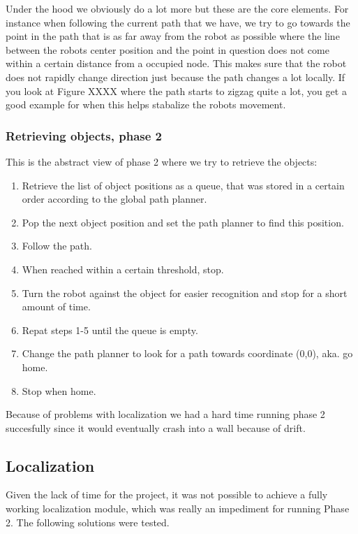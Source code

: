 Under the hood we obviously do a lot more but these are the core elements. For instance when following the current path that we have, we try to go towards the point in the path that is as far away from the robot as possible where the line between the robots center position and the point in question does not come within a certain distance from a occupied node. This makes sure that the robot does not rapidly change direction just because the path changes a lot locally. If you look at Figure XXXX where the path starts to zigzag quite a lot, you get a good example for when this helps stabalize the robots movement. 

\subsubsection{Retrieving objects, phase 2}

This is the abstract view of phase 2 where we try to retrieve the objects:

\begin{enumerate}
\item Retrieve the list of object positions as a queue, that was stored in a certain order according to the global path planner.
\item Pop the next object position and set the path planner to find this position.
\item Follow the path.
\item When reached within a certain threshold, stop.
\item Turn the robot against the object for easier recognition and stop for a short amount of time.
\item Repat steps 1-5 until the queue is empty.
\item Change the path planner to look for a path towards coordinate (0,0), aka. go home.
\item Stop when home.
\end{enumerate}

Because of problems with localization we had a hard time running phase 2 succesfully since it would eventually crash into a wall because of drift.

\subsection{Localization}
Given the lack of time for the project, it was not possible to achieve a fully working localization module, which was really an impediment for running Phase 2. The following solutions were tested.

